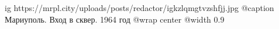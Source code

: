  
 
 
 
 

\ifcmt
  ig https://mrpl.city/uploads/posts/redactor/igkzlqmgtvzshfjj.jpg
	@caption Мариуполь. Вход в сквер. 1964 год
  @wrap center
  @width 0.9
\fi
